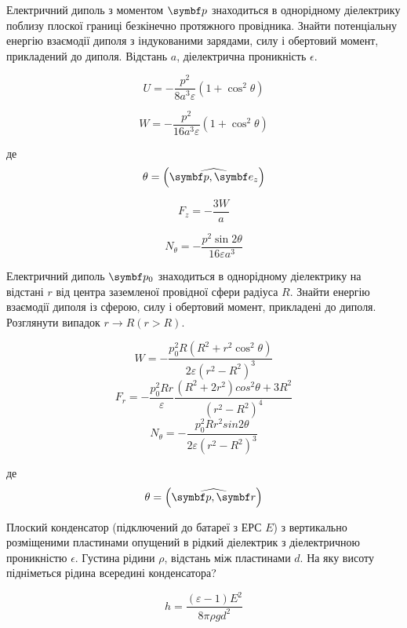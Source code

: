\documentclass[]{ProblemBook}
\begin{document}
\begin{problem}
   Електричний диполь з моментом $\vect{p}$ знаходиться в однорідному діелектрику поблизу плоскої границі безкінечно протяжного провідника. Знайти потенціальну енергію взаємодії диполя з індукованими зарядами, силу і обертовий момент, прикладений до диполя. Відстань $a$, діелектрична проникність $\epsilon$. 
	\begin{solution}

\[U =-\frac{p^2}{8a^3\varepsilon}\left(1 + \cos ^2\theta\right)\]

\[W =-\frac{p^2}{16a^3\varepsilon}\left(1 + \cos^2\theta \right)\]

де
\[\theta = \left({\widehat {\vect{p},\vect{e_z}}}\right)\]

\[{F_z} = -\frac{3W}{a}\]

\[{N_\theta } =  -\frac{p^2\sin2\theta}{16\varepsilon a^3}\]

\end{solution}
\end{problem}

\begin{problem}
   Електричний диполь $\vect{p_0}$ знаходиться в однорідному діелектрику на відстані $r$ від центра заземленої провідної сфери радіуса $R$. Знайти енергію взаємодії диполя із сферою, силу і обертовий момент, прикладені до диполя. Розглянути випадок $r \to R (r > R)$.
	\begin{solution}
\[W=-\frac{{p^2_0}R\left(R^2+r^2\cos^2\theta\right)}{2\varepsilon\left(r^2-R^2\right)^3}\]
\[F_r=-\frac{p^2_0Rr}{\varepsilon}\frac{\left(R^2+2r^2\right)cos^2\theta+3R^2}{\left(r^2-R^2\right)^4}\]
\[N_{\theta}=-\frac{p^2_0Rr^2sin 2\theta}{2\varepsilon\left(r^2-R^2\right)^3}\]

де
\[\theta = \left({\widehat {\vect{p},\vect{r}}}\right)\]
\end{solution}
\end{problem}

\begin{problem}
 Плоский конденсатор (підключений до батареї з ЕРС $E$) з вертикально розміщеними пластинами опущений в рідкий діелектрик з діелектричною проникністю $\epsilon$. Густина рідини $\rho$, відстань між пластинами $d$. На яку висоту підніметься рідина всередині конденсатора?
	\begin{solution}
\[h = \frac{\left({\varepsilon-1}\right)E^2}{8\pi \rho gd^2}\]
\end{solution}
\end{problem}
\end{document}
